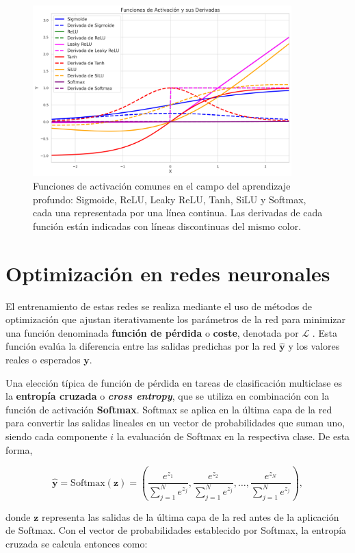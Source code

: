 \begin{figure}
	\centering
	\includegraphics[width=10cm]{img/activation_functions_figure.png}
	\caption{Funciones de activación comunes en el campo del aprendizaje profundo:
		Sigmoide, ReLU, Leaky ReLU, Tanh, SiLU y Softmax, cada una representada por
		una línea continua. Las derivadas de cada función están indicadas con líneas discontinuas
		del mismo color.}
	\label{fig:activation-functions}
\end{figure}

\section{Optimización en redes neuronales}

El entrenamiento de estas redes se realiza mediante el uso de métodos de
optimización que ajustan iterativamente los parámetros de la red para minimizar
una función denominada \textbf{función de pérdida} o \textbf{coste}, denotada por
$\mathcal{L}$ \cite{wang2020comprehensive}. Esta función evalúa la diferencia
entre las salidas predichas por la red $\mathbf{\hat{y}}$ y los valores reales o
esperados $\mathbf{y}$.

Una elección típica de función de pérdida en tareas de clasificación multiclase
es la \textbf{entropía cruzada} o \textbf{\textit{cross entropy}}, que se utiliza
en combinación con la función de activación \textbf{Softmax}. Softmax se aplica en
la última capa de la red para convertir las salidas lineales en un vector de probabilidades
que suman uno, siendo cada componente $i$ la evaluación de Softmax en la
respectiva clase. De esta forma,

\[
\mathbf{\hat{y}}= \text{Softmax}(\mathbf{z}) = \left(\frac{e^{z_1}}{\sum_{j=1}^{N}e^{z_j}}
, \frac{e^{z_2}}{\sum_{j=1}^{N}e^{z_j}}, \ldots, \frac{e^{z_N}}{\sum_{j=1}^{N}e^{z_j}}
\right),
\]

donde $\mathbf{z}$ representa las salidas de la última capa de la red antes de
la aplicación de Softmax. Con el vector de probabilidades establecido por Softmax,
la entropía cruzada se calcula entonces como:

